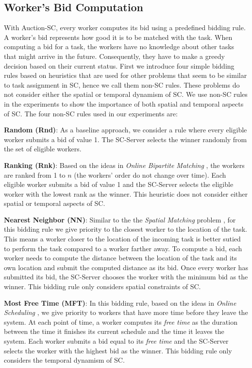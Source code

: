 \subsection{Worker's Bid Computation}

With Auction-SC, every worker computes its bid using a predefined bidding rule. A worker's bid represents how good it is to be matched with the task. When computing a bid for a task, the workers have no knowledge about other tasks that might arrive in the future. Consequently, they have to make a greedy decision based on their current status. First we introduce four simple bidding rules based on heuristics that are used for other problems that seem to be similar to task assignment in SC, hence we call them non-SC rules. These problems do not consider either the spatial or temporal dynamism of SC. We use non-SC rules in the experiments to show the importance of both spatial and temporal aspects of SC. The four non-SC rules used in our experiments are:

\noindent\textbf{Random (Rnd)}:
As a baseline approach, we consider a rule where every eligible worker submits a bid of value 1. The SC-Server selects the winner randomly from the set of eligible workers.

\noindent\textbf{Ranking (Rnk)}:
Based on the ideas in \emph{Online Bipartite Matching} \cite{Karp90}, the workers are ranked from 1 to $n$ (the workers' order do not change over time). Each eligible worker submits a bid of value 1 and the SC-Server selects the eligible worker with the lowest rank as the winner. This heuristic does not consider either spatial or temporal aspects of SC.

\noindent\textbf{Nearest Neighbor (NN)}:
Similar to the the \emph{Spatial Matching} problem \cite{Wong07}, for this bidding rule we give priority to the closest worker to the location of the task. This means a worker closer to the location of the incoming task is better sutied to perform the task compared to a worker farther away. To compute a bid, each worker needs to compute the distance between the location of the task and its own location and submit the computed distance as its bid. Once every worker has submitted its bid, the SC-Server chooses the worker with the minimum bid as the winner. This bidding rule only considers spatial constraints of SC.

\noindent\textbf{Most Free Time (MFT)}:
In this bidding rule, based on the ideas in \emph{Online Scheduling} \cite{Lee13}, we give priority to workers that have more time before they leave the system. At each point of time, a worker computes its \emph{free time} as the duration between the time it finishes its current schedule and the time it leaves the system. Each worker submits a bid equal to its \emph{free time} and the SC-Server selects the worker with the highest bid as the winner. This bidding rule only considers the temporal dynamism of SC.
 
